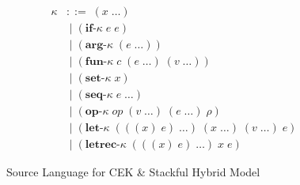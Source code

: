 \begin{figure}[!h]
\begin{align*}
        \kappa &::=\; (x\;\ldots)\\
               &\;|\; (\textbf{if-}\kappa\; e\; e)\\
               &\;|\; (\textbf{arg-}\kappa\; (e\;\ldots))\\
               &\;|\; (\textbf{fun-}\kappa\; c\; (e\;\ldots)\; (v\;\ldots))\\
               &\;|\; (\textbf{set-}\kappa\; x)\\
               &\;|\; (\textbf{seq-}\kappa\; e\;\ldots)\\
               &\;|\; (\textbf{op-}\kappa\; \textit{op}\; (v\;\ldots)\; (e\;\ldots)\; \rho)\\
               &\;|\; (\textbf{let-}\kappa\; (((x)\; e)\;\ldots)\; (x\;\ldots)\; (v\;\ldots)\; e)\\
               &\;|\; (\textbf{letrec-}\kappa\; (((x)\; e)\;\ldots)\; x\; e)
    \end{align*}

    \vspace{-1em}

    \caption{Source Language for CEK \& Stackful Hybrid Model}
    \label{fig:st-cek-grammar}
\end{figure}
